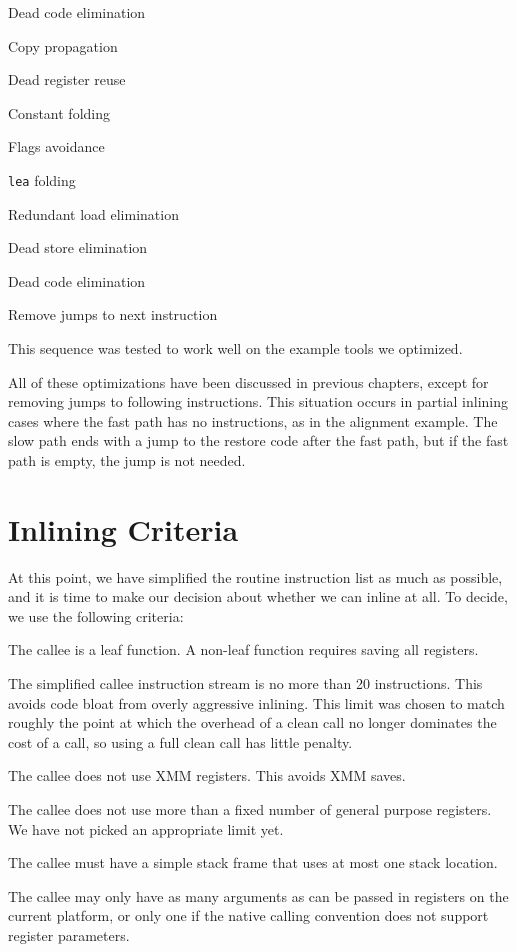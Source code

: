 \begin{packed_enumerate}
\item Dead code elimination
\item Copy propagation
\item Dead register reuse
\item Constant folding
\item Flags avoidance
\item {\tt lea} folding
\item Redundant load elimination
\item Dead store elimination
\item Dead code elimination
\item Remove jumps to next instruction
\end{packed_enumerate}

This sequence was tested to work well on the example tools we optimized.

All of these optimizations have been discussed in previous chapters, except for
removing jumps to following instructions.  This situation occurs in partial
inlining cases where the fast path has no instructions, as in the alignment
example.  The slow path ends with a jump to the restore code after the fast
path, but if the fast path is empty, the jump is not needed.

\section{Inlining Criteria}

At this point, we have simplified the routine instruction list as much as
possible, and it is time to make our decision about whether we can inline at
all.  To decide, we use the following criteria:

\begin{packed_itemize}
\item The callee is a leaf function.  A non-leaf function requires saving all
registers.
\item The simplified callee instruction stream is no more than 20 instructions.
This avoids code bloat from overly aggressive inlining.  This limit was chosen
to match roughly the point at which the overhead of a clean call no longer
dominates the cost of a call, so using a full clean call has little penalty.
\item The callee does not use XMM registers.  This avoids XMM saves.
\item The callee does not use more than a fixed number of general purpose
registers.  We have not picked an appropriate limit yet.
\item The callee must have a simple stack frame that uses at most one stack
location.
\item The callee may only have as many arguments as can be passed in registers
on the current platform, or only one if the native calling convention does not
support register parameters.
\end{packed_itemize}

